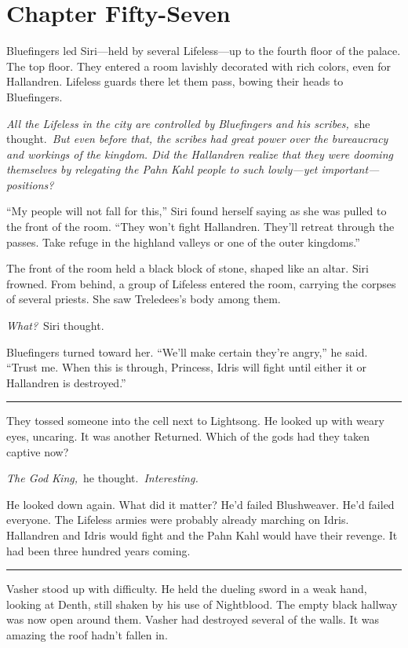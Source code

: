 \section{Chapter Fifty-Seven}

Bluefingers led Siri—held by several Lifeless—up to the fourth floor of the palace. The top floor. They entered a room lavishly decorated with rich colors, even for Hallandren. Lifeless guards there let them pass, bowing their heads to Bluefingers.

\textit{All the Lifeless in the city are controlled by Bluefingers and his scribes,}~she thought.~\textit{But even before that, the scribes had great power over the bureaucracy and workings of the kingdom. Did the Hallandren realize that they were dooming themselves by relegating the Pahn Kahl people to such lowly—yet important—positions?}

“My people will not fall for this,” Siri found herself saying as she was pulled to the front of the room. “They won’t fight Hallandren. They’ll retreat through the passes. Take refuge in the highland valleys or one of the outer kingdoms.”

The front of the room held a black block of stone, shaped like an altar. Siri frowned. From behind, a group of Lifeless entered the room, carrying the corpses of several priests. She saw Treledees’s body among them.

\textit{What?}~Siri thought.

Bluefingers turned toward her. “We’ll make certain they’re angry,” he said. “Trust me. When this is through, Princess, Idris will fight until either it or Hallandren is destroyed.”

\bigskip \hrule \bigskip

They tossed someone into the cell next to Lightsong. He looked up with weary eyes, uncaring. It was another Returned. Which of the gods had they taken captive now?

\textit{The God King,}~he thought.~\textit{Interesting.}

He looked down again. What did it matter? He’d failed Blushweaver. He’d failed everyone. The Lifeless armies were probably already marching on Idris. Hallandren and Idris would fight and the Pahn Kahl would have their revenge. It had been three hundred years coming.

\bigskip \hrule \bigskip

Vasher stood up with difficulty. He held the dueling sword in a weak hand, looking at Denth, still shaken by his use of Nightblood. The empty black hallway was now open around them. Vasher had destroyed several of the walls. It was amazing the roof hadn’t fallen in.

